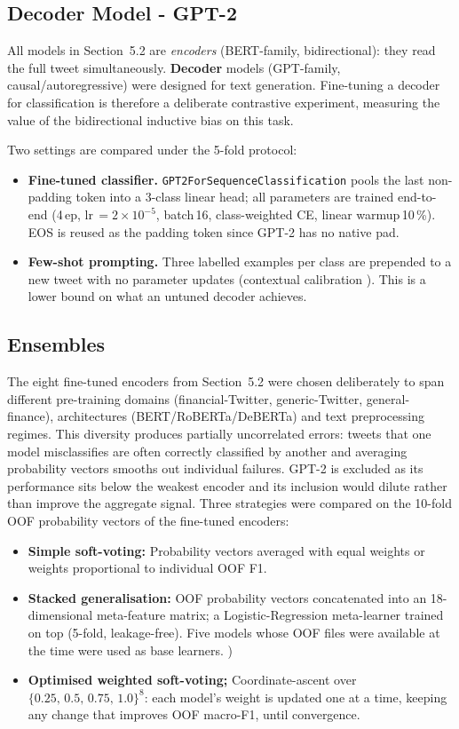 \documentclass[11pt,a4paper]{article}
\newcommand{\tH}[1]{\textcolor{maincolor}{\textbf{#1}}}
\begin{document}
\subsection{Decoder Model - GPT-2}
\label{sec:gpt2}
All models in Section~5.2 are \emph{encoders} (BERT-family, bidirectional): they read the
full tweet simultaneously. \textbf{Decoder} models (GPT-family, causal/autoregressive) were
designed for text generation. Fine-tuning a decoder for classification is therefore a deliberate contrastive experiment, measuring the value of the bidirectional inductive bias on this task.

Two settings are compared under the 5-fold protocol:
\begin{itemize}
  \item \tH{Fine-tuned classifier.} \texttt{GPT2ForSequenceClassification} pools the last
    non-padding token into a 3-class linear head; all parameters are trained end-to-end
    (4\,ep, lr\,$=2\!\times\!10^{-5}$, batch\,16, class-weighted CE, linear warmup\,10\,\%).
    EOS is reused as the padding token since GPT-2 has no native pad.
  \item \tH{Few-shot prompting.} Three labelled examples per class are prepended to a new
    tweet with no parameter updates (contextual calibration \cite{zhao2021calibrate}). This is
    a lower bound on what an untuned decoder achieves.
\end{itemize}

\subsection{Ensembles}
\label{sec:ensemble}
The eight fine-tuned encoders from Section~5.2 were chosen deliberately to span different
pre-training domains (financial-Twitter, generic-Twitter, general-finance), architectures
(BERT/RoBERTa/DeBERTa) and text preprocessing regimes. This diversity produces partially
uncorrelated errors: tweets that one model misclassifies are often correctly classified by
another and averaging probability vectors smooths out individual failures. GPT-2 is excluded as its performance sits below the weakest encoder and its inclusion would dilute rather than improve the aggregate signal. Three strategies were compared on the 10-fold OOF probability vectors of the fine-tuned encoders:
\begin{itemize}
  \item \tH{Simple soft-voting:} Probability vectors averaged with equal weights or weights
    proportional to individual OOF F1.
  \item \tH{Stacked generalisation:} OOF probability vectors concatenated
into an 18-dimensional meta-feature matrix; a Logistic-Regression meta-learner trained on top (5-fold, leakage-free). Five models whose OOF files were available at the time  were used as base learners. \cite{wolpert1992stacked})
  \item \tH{Optimised weighted soft-voting;} Coordinate-ascent over
    $\{0.25,\,0.5,\,0.75,\,1.0\}^8$: each model's weight is updated one at a time, keeping
    any change that improves OOF macro-F1, until convergence.
\end{itemize}
\end{document}
